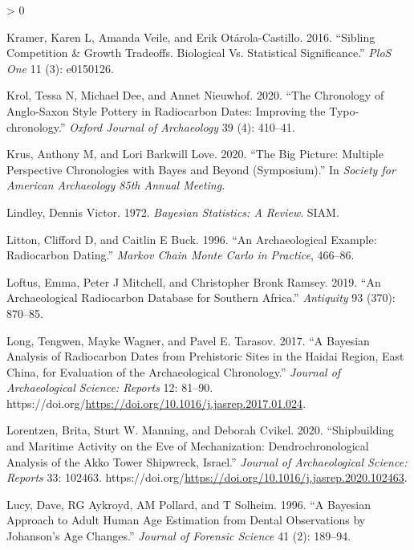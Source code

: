 \documentclass[
]{article}
\newlength{\cslhangindent}
\newenvironment{CSLReferences}[2] %
 {%
  \setlength{\parindent}{0pt}
  \ifodd #1 \everypar{\setlength{\hangindent}{\cslhangindent}}\ignorespaces\fi
  \ifnum #2 > 0
  \setlength{\parskip}{#2\baselineskip}
  \fi
 }%
 {}
\begin{document}
\begin{CSLReferences}{1}{0}
\leavevmode\hypertarget{ref-kramer_sibling_2016}{}%
Kramer, Karen L, Amanda Veile, and Erik Otárola-Castillo. 2016.
{``Sibling Competition \& Growth Tradeoffs. {Biological} Vs. Statistical
Significance.''} \emph{PloS One} 11 (3): e0150126.

\leavevmode\hypertarget{ref-krol_chronology_2020}{}%
Krol, Tessa N, Michael Dee, and Annet Nieuwhof. 2020. {``The Chronology
of {Anglo}‐{Saxon} Style Pottery in Radiocarbon Dates: Improving the
Typo‐chronology.''} \emph{Oxford Journal of Archaeology} 39 (4):
410--41.

\leavevmode\hypertarget{ref-krus_big_2020}{}%
Krus, Anthony M, and Lori Barkwill Love. 2020. {``The {Big} {Picture}:
{Multiple} {Perspective} {Chronologies} with {Bayes} and {Beyond}
({Symposium}).''} In \emph{Society for {American} {Archaeology} 85th
{Annual} {Meeting}}.

\leavevmode\hypertarget{ref-lindley_bayesian_1972}{}%
Lindley, Dennis Victor. 1972. \emph{Bayesian Statistics: {A} Review}.
SIAM.

\leavevmode\hypertarget{ref-litton_archaeological_1996}{}%
Litton, Clifford D, and Caitlin E Buck. 1996. {``An Archaeological
Example: Radiocarbon Dating.''} \emph{Markov Chain Monte Carlo in
Practice}, 466--86.

\leavevmode\hypertarget{ref-loftus_archaeological_2019}{}%
Loftus, Emma, Peter J Mitchell, and Christopher Bronk Ramsey. 2019.
{``An Archaeological Radiocarbon Database for Southern {Africa}.''}
\emph{Antiquity} 93 (370): 870--85.

\leavevmode\hypertarget{ref-long_bayesian_2017}{}%
Long, Tengwen, Mayke Wagner, and Pavel E. Tarasov. 2017. {``A {Bayesian}
Analysis of Radiocarbon Dates from Prehistoric Sites in the {Haidai}
{Region}, {East} {China}, for Evaluation of the Archaeological
Chronology.''} \emph{Journal of Archaeological Science: Reports} 12:
81--90.
https://doi.org/\url{https://doi.org/10.1016/j.jasrep.2017.01.024}.

\leavevmode\hypertarget{ref-lorentzen_shipbuilding_2020}{}%
Lorentzen, Brita, Sturt W. Manning, and Deborah Cvikel. 2020.
{``Shipbuilding and Maritime Activity on the Eve of Mechanization:
{Dendrochronological} Analysis of the {Akko} {Tower} {Shipwreck},
{Israel}.''} \emph{Journal of Archaeological Science: Reports} 33:
102463.
https://doi.org/\url{https://doi.org/10.1016/j.jasrep.2020.102463}.

\leavevmode\hypertarget{ref-lucy_bayesian_1996}{}%
Lucy, Dave, RG Aykroyd, AM Pollard, and T Solheim. 1996. {``A {Bayesian}
Approach to Adult Human Age Estimation from Dental Observations by
{Johanson}'s Age Changes.''} \emph{Journal of Forensic Science} 41 (2):
189--94.


\end{CSLReferences}
\end{document}
